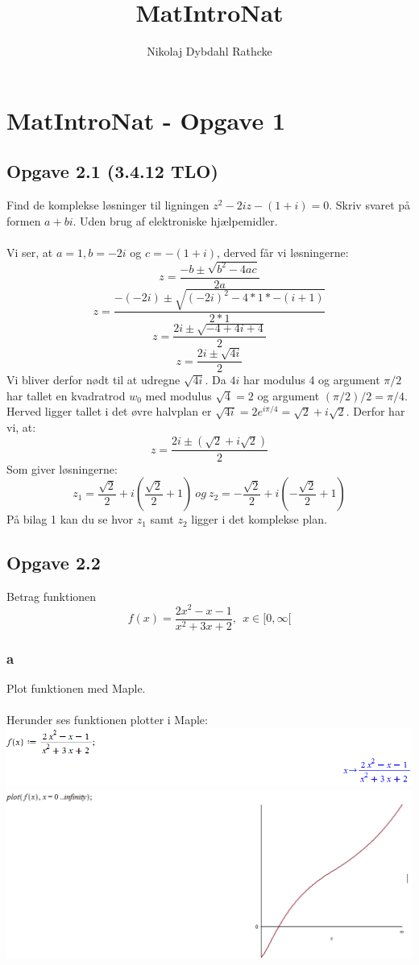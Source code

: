 \documentclass[12pt]{article}
\title{MatIntroNat}
\author{Nikolaj Dybdahl Rathcke}
\begin{document}
\section*{MatIntroNat - Opgave 1}

\subsection*{Opgave 2.1 (3.4.12 TLO)}
Find de komplekse løsninger til ligningen $z^2-2iz-(1+i)=0$. Skriv svaret på formen $a+bi$. Uden brug af elektroniske hjælpemidler.\\
\\
Vi ser, at $a=1, b=-2i$ og $c=-(1+i)$, derved får vi løsningerne:\\
$$z=\frac{-b\pm\sqrt{b^2-4ac}}{2a}$$
$$z=\frac{-(-2i)\pm\sqrt{(-2i)^2-4*1*-(i+1)}}{2*1}$$
$$z=\frac{2i\pm\sqrt{-4+4i+4}}{2}$$
$$z=\frac{2i\pm\sqrt{4i}}{2}$$
Vi bliver derfor nødt til at udregne $\sqrt{4i}$. Da $4i$ har modulus 4 og argument $\pi/2$ har tallet en kvadratrod $w_0$ med modulus $\sqrt{4}=2$ og argument $(\pi/2)/2=\pi/4$. Herved ligger tallet i det øvre halvplan er $\sqrt{4i}=2e^{i\pi/4}=\sqrt{2}+i\sqrt{2}$. Derfor har vi, at:
$$z=\frac{2i\pm(\sqrt{2}+i\sqrt{2})}{2}$$
Som giver løsningerne:
$$z_1=\frac{\sqrt{2}}{2}+i(\frac{\sqrt{2}}{2}+1)\:og\:z_2=-\frac{\sqrt{2}}{2}+i(-\frac{\sqrt{2}}{2}+1)$$
På bilag 1 kan du se hvor $z_1$ samt $z_2$ ligger i det komplekse plan.

\subsection*{Opgave 2.2}
Betrag funktionen
$$f(x)=\frac{2x^2-x-1}{x^2+3x+2},\:\:x\in[0,\infty[$$
\subsubsection*{a}
Plot funktionen med Maple.\\
\\
Herunder ses funktionen plotter i Maple:\\
\includegraphics[scale=0.6]{Pic1}\\
\includegraphics[scale=0.6]{Pic2}
\end{document}
